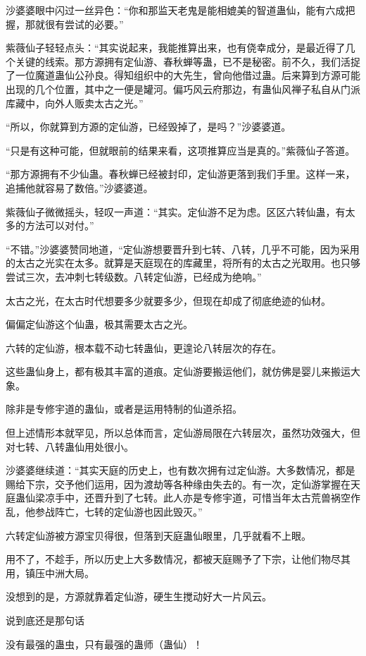 \begin{this_body}
沙婆婆眼中闪过一丝异色：“你和那监天老鬼是能相媲美的智道蛊仙，能有六成把握，那就很有尝试的必要。”

紫薇仙子轻轻点头：“其实说起来，我能推算出来，也有侥幸成分，是最近得了几个关键的线索。那方源拥有定仙游、春秋蝉等蛊，已不是秘密。前不久，我们活捉了一位魔道蛊仙公孙良。得知组织中的大先生，曾向他借过蛊。后来算到方源可能出现的几个位置，其中之一便是罐河。偏巧风云府那边，有蛊仙风禅子私自从门派库藏中，向外人贩卖太古之光。”

“所以，你就算到方源的定仙游，已经毁掉了，是吗？”沙婆婆道。

“只是有这种可能，但就眼前的结果来看，这项推算应当是真的。”紫薇仙子答道。

“那方源拥有不少仙蛊。春秋蝉已经被封印，定仙游更落到我们手里。这样一来，追捕他就容易了数倍。”沙婆婆道。

紫薇仙子微微摇头，轻叹一声道：“其实。定仙游不足为虑。区区六转仙蛊，有太多的方法可以对付。”

“不错。”沙婆婆赞同地道，“定仙游想要晋升到七转、八转，几乎不可能，因为采用的太古之光实在太多。就算是天庭现在的库藏里，将所有的太古之光取用。也只够尝试三次，去冲刺七转级数。八转定仙游，已经成为绝响。”

太古之光，在太古时代想要多少就要多少，但现在却成了彻底绝迹的仙材。

偏偏定仙游这个仙蛊，极其需要太古之光。

六转的定仙游，根本载不动七转蛊仙，更遑论八转层次的存在。

这些蛊仙身上，都有极其丰富的道痕。定仙游要搬运他们，就仿佛是婴儿来搬运大象。

除非是专修宇道的蛊仙，或者是运用特制的仙道杀招。

但上述情形本就罕见，所以总体而言，定仙游局限在六转层次，虽然功效强大，但对七转、八转蛊仙用处很小。

沙婆婆继续道：“其实天庭的历史上，也有数次拥有过定仙游。大多数情况，都是赐给下宗，交予他们运用，因为渡劫等各种缘由失去的。有一次，定仙游掌握在天庭蛊仙梁凉手中，还晋升到了七转。此人亦是专修宇道，可惜当年太古荒兽祸空作乱，他参战阵亡，七转的定仙游也因此毁灭。”

六转定仙游被方源宝贝得很，但落到天庭蛊仙眼里，几乎就看不上眼。

用不了，不趁手，所以历史上大多数情况，都被天庭赐予了下宗，让他们物尽其用，镇压中洲大局。

没想到的是，方源就靠着定仙游，硬生生搅动好大一片风云。

说到底还是那句话

没有最强的蛊虫，只有最强的蛊师（蛊仙）！


\end{this_body}
